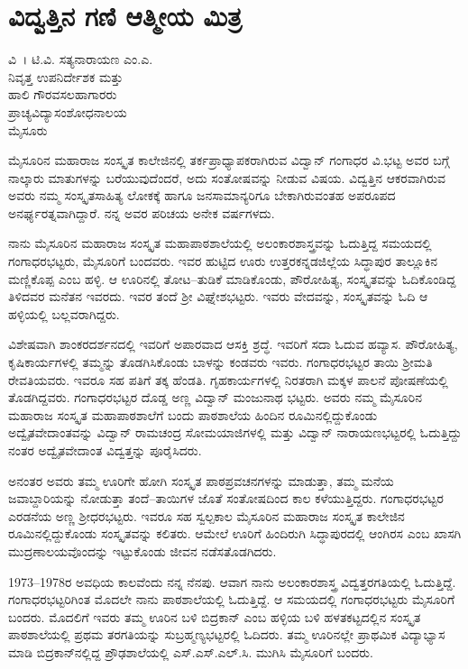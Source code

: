 \chapter{ವಿದ್ವತ್ತಿನ ಗಣಿ ಆತ್ಮೀಯ ಮಿತ್ರ}

\begin{center}
\smallskip

ವಿ~। ಟಿ.ವಿ. ಸತ್ಯನಾರಾಯಣ ಎಂ.ಎ.\\
ನಿವೃತ್ತ ಉಪನಿರ್ದೇಶಕ ಮತ್ತು\\ 
ಹಾಲಿ ಗೌರವಸಲಹಾಗಾರರು\\
ಪ್ರಾಚ್ಯವಿದ್ಯಾಸಂಶೋಧನಾಲಯ\\
ಮೈಸೂರು
\addrule
\end{center}

ಮೈಸೂರಿನ ಮಹಾರಾಜ ಸಂಸ್ಕೃತ ಕಾಲೇಜಿನಲ್ಲಿ ತರ್ಕಪ್ರಾಧ್ಯಾಪಕರಾಗಿರುವ ವಿದ್ವಾನ್ ಗಂಗಾಧರ ವಿ.ಭಟ್ಟ ಅವರ ಬಗ್ಗೆ ನಾಲ್ಕಾರು ಮಾತುಗಳನ್ನು ಬರೆಯುವುದೆಂದರೆ, ಅದು ಸಂತೋಷವನ್ನು ನೀಡುವ ವಿಷಯ. ವಿದ್ವತ್ತಿನ ಆಕರವಾಗಿರುವ ಅವರು ನಮ್ಮ ಸಂಸ್ಕೃತಸಾಹಿತ್ಯ ಲೋಕಕ್ಕೆ ಹಾಗೂ ಜನಸಾಮಾನ್ಯರಿಗೂ ಬೇಕಾಗಿರುವಂತಹ ಅಪರೂಪದ ಅನರ್ಘ್ಯರತ್ನವಾಗಿದ್ದಾರೆ. ನನ್ನ ಅವರ ಪರಿಚಯ ಅನೇಕ ವರ್ಷಗಳದು. 

ನಾನು ಮೈಸೂರಿನ ಮಹಾರಾಜ ಸಂಸ್ಕೃತ ಮಹಾಪಾಠಶಾಲೆಯಲ್ಲಿ ಅಲಂಕಾರಶಾಸ್ತ್ರವನ್ನು ಓದುತ್ತಿದ್ದ ಸಮಯದಲ್ಲಿ ಗಂಗಾಧರಭಟ್ಟರು, ಮೈಸೂರಿಗೆ ಬಂದವರು. ಇವರ ಹುಟ್ಟಿದ ಊರು ಉತ್ತರಕನ್ನಡಜಿಲ್ಲೆಯ ಸಿದ್ಧಾಪುರ ತಾಲ್ಲೂಕಿನ ಮಣ್ಣಿಕೊಪ್ಪ ಎಂಬ ಹಳ್ಳಿ. ಆ ಊರಿನಲ್ಲಿ ತೋಟ–ತುಡಿಕೆ ಮಾಡಿಕೊಂಡು, ಪೌರೋಹಿತ್ಯ, ಸಂಸ್ಕೃತವನ್ನು ಓದಿಕೊಂಡಿದ್ದ ತಿಳಿದವರ ಮನೆತನ ಇವರದು. ಇವರ ತಂದೆ ಶ್ರೀ ವಿಘ್ನೇಶಭಟ್ಟರು. ಇವರು ವೇದವನ್ನು, ಸಂಸ್ಕೃತವನ್ನು ಓದಿ ಆ ಹಳ್ಳಿಯಲ್ಲಿ ಬಲ್ಲವರಾಗಿದ್ದರು.

ವಿಶೇಷವಾಗಿ ಶಾಂಕರದರ್ಶನದಲ್ಲಿ ಇವರಿಗೆ ಅಪಾರವಾದ ಆಸಕ್ತಿ ಶ್ರದ್ಧೆ. ಇವರಿಗೆ ಸದಾ ಓದುವ ಹವ್ಯಾಸ. ಪೌರೋಹಿತ್ಯ, ಕೃಷಿಕಾರ್ಯಗಳಲ್ಲಿ ತಮ್ಮನ್ನು ತೊಡಗಿಸಿಕೊಂಡು ಬಾಳನ್ನು ಕಂಡವರು ಇವರು. ಗಂಗಾಧರಭಟ್ಟರ ತಾಯಿ ಶ್ರೀಮತಿ ರೇವತಿಯವರು. ಇವರೂ ಸಹ ಪತಿಗೆ ತಕ್ಕ ಹೆಂಡತಿ. ಗೃಹಕಾರ್ಯಗಳಲ್ಲಿ ನಿರತರಾಗಿ ಮಕ್ಕಳ ಪಾಲನೆ ಪೋಷಣೆಯಲ್ಲಿ ತೊಡಗಿದ್ದವರು. ಗಂಗಾಧರಭಟ್ಟರ ದೊಡ್ಡ ಅಣ್ಣ ವಿದ್ವಾನ್ ಮಂಜುನಾಥ ಭಟ್ಟರು. ಅವರು ನಮ್ಮ ಮೈಸೂರಿನ ಮಹಾರಾಜ ಸಂಸ್ಕೃತ ಮಹಾಪಾಠಶಾಲೆಗೆ ಬಂದು ಪಾಠಶಾಲೆಯ ಹಿಂದಿನ ರೂಮಿನಲ್ಲಿದ್ದುಕೊಂಡು ಅದ್ವೈತವೇದಾಂತವನ್ನು ವಿದ್ವಾನ್ ರಾಮಚಂದ್ರ ಸೋಮಯಾಜಿಗಳಲ್ಲಿ ಮತ್ತು ವಿದ್ವಾನ್ ನಾರಾಯಣಭಟ್ಟರಲ್ಲಿ ಓದುತ್ತಿದ್ದು ನಂತರ ಅದ್ವೈತವೇದಾಂತ ವಿದ್ವತ್ತನ್ನು ಪೂರೈಸಿದರು. 

ಅನಂತರ ಅವರು ತಮ್ಮ ಊರಿಗೇ ಹೋಗಿ ಸಂಸ್ಕೃತ ಪಾಠಪ್ರವಚನಗಳನ್ನು ಮಾಡುತ್ತಾ, ತಮ್ಮ ಮನೆಯ ಜವಾಬ್ದಾರಿಯನ್ನು ನೋಡುತ್ತಾ ತಂದೆ–ತಾಯಿಗಳ ಜೊತೆ ಸಂತೋಷದಿಂದ ಕಾಲ ಕಳೆಯುತ್ತಿದ್ದರು. ಗಂಗಾಧರಭಟ್ಟರ ಎರಡನೆಯ ಅಣ್ಣ ಶ್ರೀಧರಭಟ್ಟರು. ಇವರೂ ಸಹ ಸ್ವಲ್ಪಕಾಲ ಮೈಸೂರಿನ ಮಹಾರಾಜ ಸಂಸ್ಕೃತ ಕಾಲೇಜಿನ ರೂಮಿನಲ್ಲಿದ್ದುಕೊಂಡು ಸಂಸ್ಕೃತವನ್ನು ಕಲಿತರು. ಆಮೇಲೆ ಊರಿಗೆ ಹಿಂದಿರುಗಿ ಸಿದ್ಧಾಪುರದಲ್ಲಿ ಆಂಗಿರಸ ಎಂಬ ಖಾಸಗಿ ಮುದ್ರಣಾಲಯವೊಂದನ್ನು ಇಟ್ಟುಕೊಂಡು ಜೀವನ ನಡೆಸತೊಡಗಿದರು.

1973–1978ರ ಅವಧಿಯ ಕಾಲವೆಂದು ನನ್ನ ನೆನಪು. ಆವಾಗ ನಾನು ಅಲಂಕಾರಶಾಸ್ತ್ರ ವಿದ್ವತ್ತರಗತಿಯಲ್ಲಿ ಓದುತ್ತಿದ್ದೆ. ಗಂಗಾಧರಭಟ್ಟರಿಗಿಂತ ಮೊದಲೇ ನಾನು ಪಾಠಶಾಲೆಯಲ್ಲಿ ಓದುತ್ತಿದ್ದೆ. ಆ ಸಮಯದಲ್ಲಿ ಗಂಗಾಧರಭಟ್ಟರು ಮೈಸೂರಿಗೆ ಬಂದರು. ಮೊದಲಿಗೆ ಇವರು ತಮ್ಮ ಊರಿನ ಬಳಿ ಬಿದ್ರಕಾನ್ ಎಂಬ ಹಳ್ಳಿಯ ಬಳಿ ಹಳತಕಟ್ಟದಲ್ಲಿನ ಸಂಸ್ಕೃತ ಪಾಠಶಾಲೆಯಲ್ಲಿ ಪ್ರಥಮ ತರಗತಿಯನ್ನು ಸುಬ್ರಹ್ಮಣ್ಯಭಟ್ಟರಲ್ಲಿ ಓದಿದರು. ತಮ್ಮ ಊರಿನಲ್ಲೇ ಪ್ರಾಥಮಿಕ ವಿದ್ಯಾಭ್ಯಾಸ ಮಾಡಿ ಬಿದ್ರಕಾನ್‍ನಲ್ಲಿದ್ದ ಪ್ರೌಢಶಾಲೆಯಲ್ಲಿ ಎಸ್.ಎಸ್.ಎಲ್.ಸಿ. ಮುಗಿಸಿ ಮೈಸೂರಿಗೆ ಬಂದರು.

